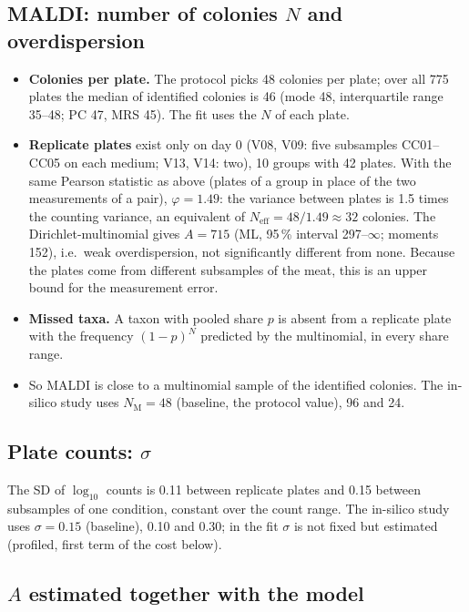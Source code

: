 \documentclass[11pt,a4paper]{article}
\begin{document}
\subsection{MALDI: number of colonies $N$ and overdispersion}

\begin{itemize}
\item \textbf{Colonies per plate.} The protocol picks 48 colonies per plate; over all 775 plates the median of identified colonies is 46 (mode 48, interquartile range 35--48; PC 47, MRS 45). The fit uses the $N$ of each plate.
\item \textbf{Replicate plates} exist only on day 0 (V08, V09: five subsamples CC01--CC05 on each medium; V13, V14: two), 10 groups with 42 plates. With the same Pearson statistic as above (plates of a group in place of the two measurements of a pair), $\varphi = 1.49$: the variance between plates is 1.5 times the counting variance, an equivalent of $N_{\mathrm{eff}} = 48/1.49 \approx 32$ colonies. The Dirichlet-multinomial gives $A = 715$ (ML, 95\,\% interval 297--$\infty$; moments 152), i.e.\ weak overdispersion, not significantly different from none. Because the plates come from different subsamples of the meat, this is an upper bound for the measurement error.
\item \textbf{Missed taxa.} A taxon with pooled share $p$ is absent from a replicate plate with the frequency $(1-p)^N$ predicted by the multinomial, in every share range.
\item So MALDI is close to a multinomial sample of the identified colonies. The in-silico study uses $N_{\mathrm{M}} = 48$ (baseline, the protocol value), 96 and 24.
\end{itemize}

\subsection{Plate counts: $\sigma$}

The SD of $\log_{10}$ counts is 0.11 between replicate plates and 0.15 between subsamples of one condition, constant over the count range. The in-silico study uses $\sigma = 0.15$ (baseline), 0.10 and 0.30; in the fit $\sigma$ is not fixed but estimated (profiled, first term of the cost below).

\subsection{$A$ estimated together with the model}
\end{document}
